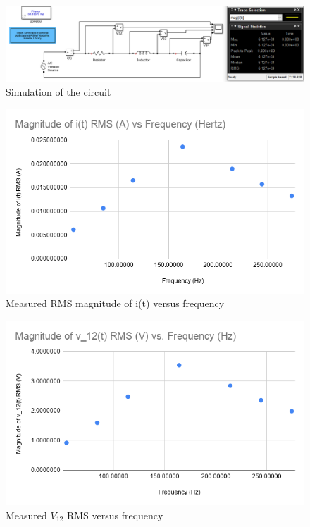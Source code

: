 \documentclass{article}
\begin{document}
\newpage
\begin{figure}[H]
    \centering
        \includegraphics[width=\textwidth]{ECE2101L_Lab10_B1.png}
        \caption{Simulation of the circuit}
\end{figure}
\begin{figure}[H]
    \centering
        \includegraphics[scale=0.45]{ECE2101L_Lab10_B1_plot1.png}
        \caption{Measured RMS magnitude of i(t) versus frequency}
\end{figure}
\begin{figure}[H]
    \centering
        \includegraphics[scale=0.45]{ECE2101L_Lab10_B1_plot2.png}
        \caption{Measured $V_{12}$ RMS versus frequency}
\end{figure}
\end{document}
